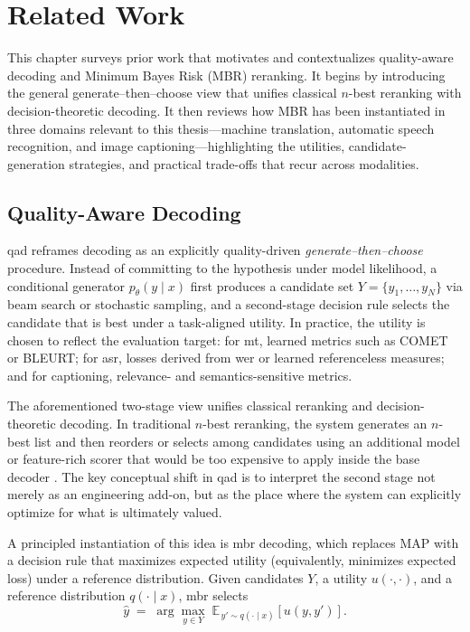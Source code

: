 
\chapter{Related Work}
\label{chapter:related_work}
This chapter surveys prior work that motivates and contextualizes quality-aware decoding and Minimum Bayes Risk (MBR) reranking. It begins by introducing the general generate--then--choose view that unifies classical $n$-best reranking with decision-theoretic decoding. It then reviews how MBR has been instantiated in three domains relevant to this thesis---machine translation, automatic speech recognition, and image captioning---highlighting the utilities, candidate-generation strategies, and practical trade-offs that recur across modalities.

\section{Quality-Aware Decoding}
\gls{qad} reframes decoding as an explicitly quality-driven \emph{generate--then--choose} procedure. Instead of committing to the  hypothesis under model likelihood, a conditional generator \(p_{\theta}(y\!\mid\!x)\) first produces a candidate set \(Y=\{y_1,\dots,y_N\}\) via beam search or stochastic sampling, and a second-stage decision rule selects the candidate that is best under a task-aligned utility. In practice, the utility is chosen to reflect the evaluation target: for \gls{mt}, learned metrics such as COMET or BLEURT; for \gls{asr}, losses derived from \gls{wer} or learned referenceless measures; and for captioning, relevance- and semantics-sensitive metrics. 

The aforementioned two-stage view unifies classical reranking and decision-theoretic decoding. In traditional \(n\)-best reranking, the system generates an \(n\)-best list and then reorders or selects among candidates using an additional model or feature-rich scorer that would be too expensive to apply inside the base decoder \cite{och2003mert,duh2008boosted,quan2005integratednbest,shen2004drmt}. The key conceptual shift in \gls{qad} is to interpret the second stage not merely as an engineering add-on, but as the place where the system can explicitly optimize for what is ultimately valued.

A principled instantiation of this idea is \gls{mbr} decoding, which replaces MAP with a decision rule that maximizes expected utility (equivalently, minimizes expected loss) under a reference distribution. Given candidates \(Y\), a utility \(u(\cdot,\cdot)\), and a reference distribution \(q(\cdot\mid x)\), \gls{mbr} selects
\[
\hat{y} \;=\; \arg\max_{y \in Y}\; \mathbb{E}_{\,y' \sim q(\cdot \mid x)}\!\left[u\!\left(y, y'\right)\right].
\]

